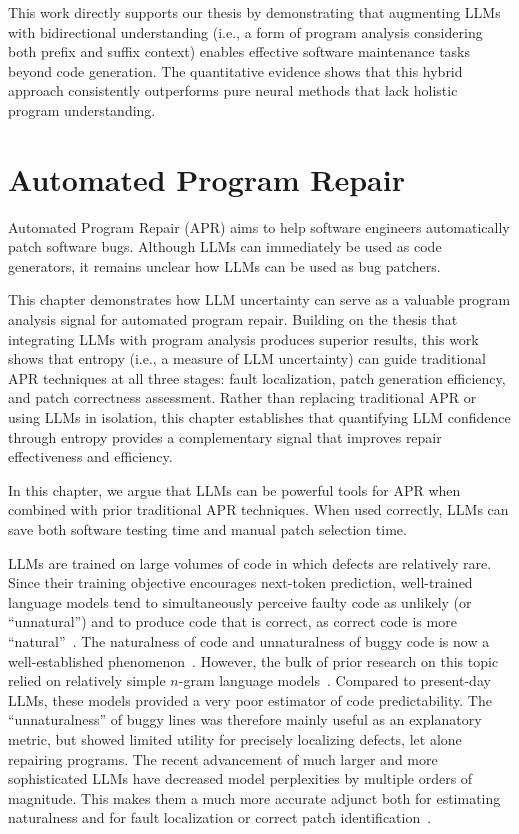 \documentclass[12pt,openany,oneside,table]{cmuthesis}
\begin{document}
This work directly supports our thesis by demonstrating that augmenting LLMs with bidirectional understanding (i.e., a form of program analysis considering both prefix and suffix context) enables effective software maintenance tasks beyond code generation. The quantitative evidence shows that this hybrid approach consistently outperforms pure neural methods that lack holistic program understanding.

\chapter{Automated Program Repair}
\label{ch:entropy}
Automated Program Repair (APR) aims to help software engineers automatically patch software bugs. Although LLMs can immediately be used as code generators, it remains unclear how LLMs can be used as bug patchers.

This chapter demonstrates how LLM uncertainty can serve as a valuable program analysis signal for automated program repair. Building on the thesis that integrating LLMs with program analysis produces superior results, this work shows that entropy (i.e., a measure of LLM uncertainty) can guide traditional APR techniques at all three stages: fault localization, patch generation efficiency, and patch correctness assessment. Rather than replacing traditional APR or using LLMs in isolation, this chapter establishes that quantifying LLM confidence through entropy provides a complementary signal that improves repair effectiveness and efficiency.

In this chapter, we argue that LLMs can be powerful tools for APR when combined with prior traditional APR techniques. When used correctly, LLMs can save both software testing time and manual patch selection time.

LLMs are trained on large volumes of code in which defects are relatively
rare. Since their training objective encourages next-token prediction,
well-trained language models tend to simultaneously perceive faulty code as unlikely
(or ``unnatural'') and to produce code that is correct, as correct code is more
``natural''~\cite{NAT}. The naturalness of code and unnaturalness of buggy 
code is now a well-established phenomenon~\cite{hindle2016naturalness,NAT}.
However, the bulk of prior research on this topic relied on relatively simple $n$-gram language
models~\cite{ngram}. Compared to present-day LLMs, these models provided a
very poor estimator of code predictability. The ``unnaturalness'' of
buggy lines was therefore mainly useful as an explanatory metric, but showed limited
utility for precisely localizing defects, let alone repairing programs.
The recent advancement of much larger and more sophisticated LLMs have decreased model
perplexities by multiple orders of magnitude. This makes them a much more accurate adjunct both for estimating naturalness and
for fault localization or correct patch identification~\cite{xia2023automated,
yang2023large}.
\end{document}
